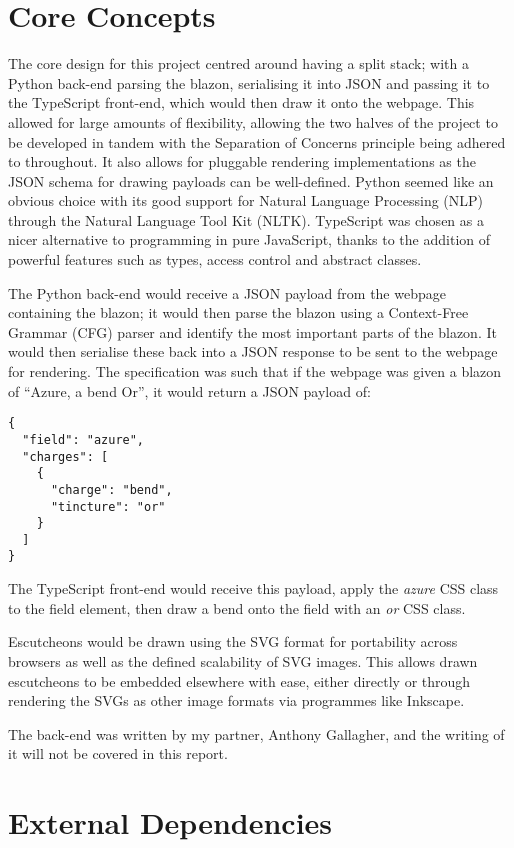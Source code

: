 \documentclass[nobib, a4paper, twoside, justified]{tufte-book}
\begin{document}
\section{Core Concepts}%
\label{sec:core_concepts}

The core design for this project centred around having a split stack; with a Python back-end
parsing the blazon, serialising it into JSON and passing it to the TypeScript front-end, which
would then draw it onto the webpage. This allowed for large amounts of flexibility, allowing the
two halves of the project to be developed in tandem with the Separation of Concerns principle being
adhered to throughout. It also allows for pluggable rendering implementations as the JSON schema
for drawing payloads can be well-defined. Python seemed like an obvious choice with its good
support for Natural Language Processing (NLP) through the Natural Language Tool Kit (NLTK).
TypeScript was chosen as a nicer alternative to programming in pure JavaScript, thanks to the
addition of powerful features such as types, access control and abstract classes.

The Python back-end would receive a JSON payload from the webpage containing the blazon; it would
then parse the blazon using a Context-Free Grammar (CFG) parser and identify the most important
parts of the blazon. It would then serialise these back into a JSON response to be sent to the
webpage for rendering. The specification was such that if the webpage was given a blazon of
``Azure, a bend Or'', it would return a JSON payload of:

\begin{verbatim}
{
  "field": "azure",
  "charges": [
    {
      "charge": "bend",
      "tincture": "or"
    }
  ]
}
\end{verbatim}

The TypeScript front-end would receive this payload, apply the \textit{azure} CSS class to the
field element, then draw a bend onto the field with an \textit{or} CSS class.

Escutcheons would be drawn using the SVG format for portability across browsers as well as the
defined scalability of SVG images. This allows drawn escutcheons to be embedded elsewhere with
ease, either directly or through rendering the SVGs as other image formats via programmes like
Inkscape.

The back-end was written by my partner, Anthony Gallagher, and the writing of it will not be
covered in this report.

\section{External Dependencies}%
\label{sec:external_dependencies}
\end{document}

